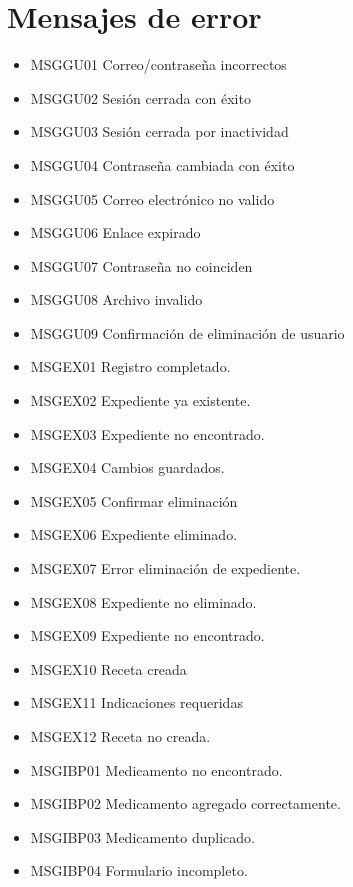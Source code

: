 \documentclass[12pt,letterpaper]{article}
\begin{document}
    \section{Mensajes de error}
        \begin{itemize}
            \item MSGGU01 Correo/contraseña incorrectos
            \item MSGGU02 Sesión cerrada con éxito
            \item MSGGU03 Sesión cerrada por inactividad
            \item MSGGU04 Contraseña cambiada con éxito
            \item MSGGU05 Correo electrónico no valido
            \item MSGGU06 Enlace expirado
            \item MSGGU07 Contraseña no coinciden
            \item MSGGU08 Archivo invalido
            \item MSGGU09 Confirmación de eliminación de usuario
            \item MSGEX01 Registro completado.
            \item MSGEX02 Expediente ya existente.
            \item MSGEX03 Expediente no encontrado.
            \item MSGEX04 Cambios guardados.
            \item MSGEX05 Confirmar eliminación
            \item MSGEX06 Expediente eliminado.
            \item MSGEX07 Error eliminación de expediente.
            \item MSGEX08 Expediente no eliminado.
            \item MSGEX09 Expediente no encontrado.
            \item MSGEX10 Receta creada
            \item MSGEX11 Indicaciones requeridas
            \item MSGEX12 Receta no creada.
            \item MSGIBP01 Medicamento no encontrado.
            \item MSGIBP02 Medicamento agregado correctamente.
            \item MSGIBP03 Medicamento duplicado.
            \item MSGIBP04 Formulario incompleto.
        \end{itemize}
\end{document}

